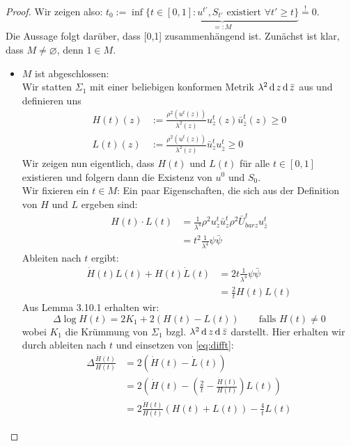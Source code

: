 \begin{proof}
  Wir zeigen also: $t_0 := \inf \underbrace{\{t \in [0,1] : u^{t'}, S_{t'} \text{ existiert } \forall t' \geq t \}}_{ =: M} \stackrel{!}{=} 0$. \\
  Die Aussage folgt darüber, dass [0,1] zusammenhängend ist. Zunächst ist klar, dass $M \neq \varnothing$, denn $1 \in M$.
  \begin{itemize}
    \item $M$ ist abgeschlossen: \\
      Wir statten $\Sigma_1$ mit einer beliebigen konformen Metrik $\lambda^2 \d[z]\d[\bar z]$ aus und definieren uns
      \begin{align*}
	H(t)(z) & := \frac{\rho^2(u^t(z))}{\lambda^2(z)} u^t_z(z) \bar u^t_{\bar z}(z) \geq 0 \\
	L(t)(z) & := \frac{\rho^2(u^t(z))}{\lambda^2(z)} \bar u^t_z u^t_{\bar z} \geq 0
      \end{align*}
      Wir zeigen nun eigentlich, dass $H(t)$ und $L(t)$ für alle $t \in [0,1]$ existieren und folgern dann die Existenz von $u^0$ und $S_0$. \\
      Wir fixieren ein $t \in M$:
      Ein paar Eigenschaften, die sich aus der Definition von $H$ und $L$ ergeben sind:
      \begin{align*}
	H(t) \cdot L(t) & = \frac{1}{\lambda^4} \rho^2 u^t_z \bar u^t_z \rho^2 \bar U^t_{bar z} u^t_{\bar z} \\
	& = t^2 \frac{1}{\lambda^4} \psi \bar \psi \tag{1} \label{eq:HL}
      \end{align*}
      Ableiten nach $t$ ergibt:
      \begin{align*}
	\dot H(t) L(t) + H(t) \dot L(t) & = 2t \frac{1}{\lambda^4} \psi \bar \psi \\
	& = \frac2t H(t) L(t) \tag{2} \label{eq:difft}
      \end{align*}
      Aus Lemma 3.10.1 erhalten wir:
      \[
      \Delta \log H(t) = 2K_1 + 2(H(t) - L(t)) \qquad \text{falls } H(t) \neq 0 \tag{3} \label{eq:logH}
      \]
      wobei $K_1$ die Krümmung von $\Sigma_1$ bzgl. $\lambda^2\d[z] \d[\bar z]$ darstellt. Hier erhalten wir durch ableiten nach $t$ und einsetzen von \eqref{eq:difft}:
      \begin{align*}
	\Delta \frac{\dot H(t)}{H(t)} & = 2(\dot H(t) - \dot L(t)) \\
	& = 2( \dot H(t) - \left (\frac2t - \frac{\dot H(t)}{H(t)} \right) L(t)) \\
	& = 2 \frac{\dot H(t)}{H(t)}(H(t) + L(t)) - \frac4t L(t)

\end{align*}
\end{itemize}
\end{proof}
